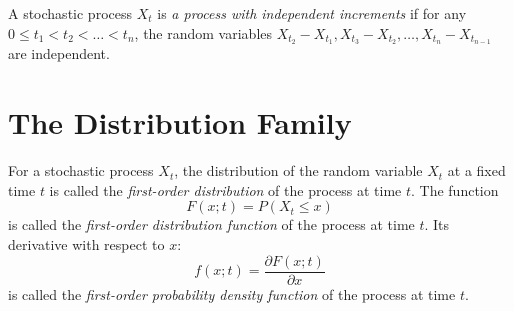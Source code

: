 \begin{definition}
  A stochastic process \(X_t\) is \emph{a process with independent increments} if for any \(0 \leq t_1 < t_2 < \dots < t_n\), the random variables \(X_{t_2} - X_{t_1}, X_{t_3} - X_{t_2}, \dots, X_{t_n} - X_{t_{n-1}}\) are independent.
\end{definition}

\section{The Distribution Family}

\begin{definition}
  For a stochastic process \(X_t\), the distribution of the random variable \(X_t\) at a fixed time \(t\) is called the \emph{first-order distribution} of the process at time \(t\). The function
  \[
    F(x; t) = P(X_t \leq x)
  \]
  is called the \emph{first-order distribution function} of the process at time \(t\). Its derivative with respect to \(x\):
  \[
    f(x; t) = \frac{\partial F(x; t)}{\partial x}
  \]
  is called the \emph{first-order probability density function} of the process at time \(t\).
\end{definition}

